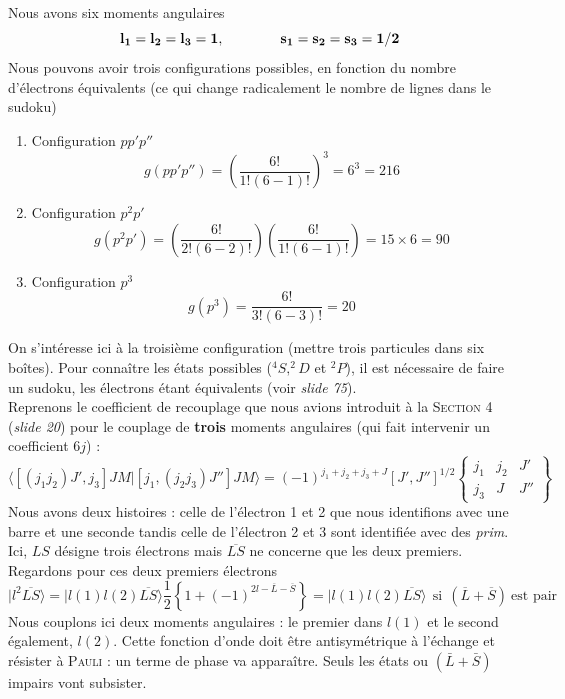 Nous avons six moments angulaires
\begin{equation}
{\bf l_1} = {\bf l_2} =  {\bf l_3} =  {\bf 1},\qquad\qquad
{\bf s_1} = {\bf s_2} = {\bf s_3} = {\bf 1/2} 
\end{equation}
Nous pouvons avoir trois configurations possibles, en fonction du nombre d'électrons 
équivalents (ce qui change radicalement le nombre de lignes dans le sudoku)
\begin{enumerate}
\item Configuration $pp'p''$
\begin{equation}
g (pp'p'') = \left( \frac{6!}{1! (6-1)!} \right)^3 = 6^3 = 216
\end{equation}
\item Configuration $p^2p'$
\begin{equation}
g (p^2 p') = \left( \frac{6!}{2! (6-2)!} \right)
\left( \frac{6!}{1! (6-1)!} \right) = 15 \times 6 = 90
\end{equation}
\item Configuration $p^3$
\begin{equation}
g (p^3) = \frac{6!}{3! (6-3)!} = 20
\end{equation}
\end{enumerate}
On s'intéresse ici à la troisième configuration (mettre trois particules dans six boîtes). 
Pour connaître les états possibles ($^4S, ^2D$ et $^2P$), il est nécessaire de faire un
sudoku, les électrons étant équivalents (voir \textit{slide 75}).\\

Reprenons le coefficient de recouplage que nous avions introduit à la \textsc{Section 4}
(\textit{slide 20}) pour le couplage de \textbf{trois} moments angulaires (qui fait intervenir
un coefficient $6j$) :
\begin{equation}
\langle [ (j_1 j_2) J', j_3] JM 
\vert [j_1,(j_2 j_3) J''] JM \rangle
= 
(-1)^{j_1+j_2+j_3+J} [J',J'']^{1/2} \left\{ 
\begin{array}{ccc}
j_1 & j_2 & J' \\
j_3 & J & J''
\end{array} \right\}
\end{equation}
Nous avons deux histoires : celle de l'électron 1 et 2 que nous identifions avec une barre
et une seconde tandis celle de l'électron 2 et 3 sont identifiée avec des \textit{prim}. Ici, $LS$ désigne trois électrons mais $\overline{LS}$
ne concerne que les deux premiers. Regardons pour ces deux premiers électrons
\begin{equation}
\vert l^2 \overline{LS } \rangle
=  \vert l(1) l(2) \overline{LS} \rangle 
\frac{1}{2} 
\left\{ 1 
+ (-1)^{2l-\overline{L}-\overline{S}} 
 \right\} = \vert l(1) l(2) \overline{LS} \rangle 
~~\mbox{si}~~
(\overline{L}+\overline{S})~\mbox{est pair}
\end{equation}
Nous couplons ici deux moments angulaires : le premier dans $l(1)$ et le second également, $l(2)$. 
Cette fonction d'onde doit être antisymétrique à l'échange et résister à \textsc{Pauli} : un 
terme de phase va apparaître. Seuls les états ou $(\bar{L}+\bar{S})$  impairs vont subsister.\\

